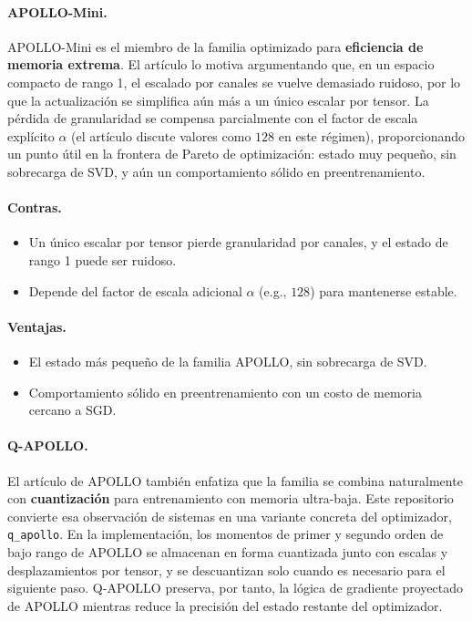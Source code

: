 \paragraph{APOLLO-Mini.}
APOLLO-Mini es el miembro de la familia optimizado para \textbf{eficiencia de memoria extrema}. El artículo lo motiva argumentando que, en un espacio compacto de rango 1, el escalado por canales se vuelve demasiado ruidoso, por lo que la actualización se simplifica aún más a un único escalar por tensor. La pérdida de granularidad se compensa parcialmente con el factor de escala explícito $\alpha$ (el artículo discute valores como $128$ en este régimen), proporcionando un punto útil en la frontera de Pareto de optimización: estado muy pequeño, sin sobrecarga de SVD, y aún un comportamiento sólido en preentrenamiento.

\paragraph{Contras.}
\begin{itemize}[leftmargin=*]
\item Un único escalar por tensor pierde granularidad por canales, y el estado de rango 1 puede ser ruidoso.
\item Depende del factor de escala adicional $\alpha$ (e.g., $128$) para mantenerse estable.
\end{itemize}

\paragraph{Ventajas.}
\begin{itemize}[leftmargin=*]
\item El estado más pequeño de la familia APOLLO, sin sobrecarga de SVD.
\item Comportamiento sólido en preentrenamiento con un costo de memoria cercano a SGD.
\end{itemize}

\paragraph{Q-APOLLO.}
El artículo de APOLLO también enfatiza que la familia se combina naturalmente con \textbf{cuantización} para entrenamiento con memoria ultra-baja. Este repositorio convierte esa observación de sistemas en una variante concreta del optimizador, \texttt{q\_apollo}. En la implementación, los momentos de primer y segundo orden de bajo rango de APOLLO se almacenan en forma cuantizada junto con escalas y desplazamientos por tensor, y se descuantizan solo cuando es necesario para el siguiente paso. Q-APOLLO preserva, por tanto, la lógica de gradiente proyectado de APOLLO mientras reduce la precisión del estado restante del optimizador.

